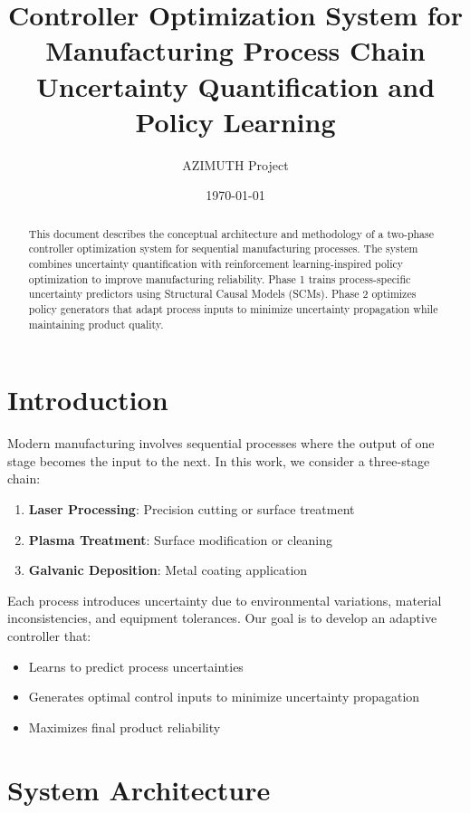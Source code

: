 \documentclass[11pt,a4paper]{article}
\title{\textbf{Controller Optimization System for Manufacturing Process Chain}\\
\large Uncertainty Quantification and Policy Learning}
\author{AZIMUTH Project}
\date{\today}
\begin{document}
\maketitle

\begin{abstract}
This document describes the conceptual architecture and methodology of a two-phase controller optimization system for sequential manufacturing processes. The system combines uncertainty quantification with reinforcement learning-inspired policy optimization to improve manufacturing reliability. Phase 1 trains process-specific uncertainty predictors using Structural Causal Models (SCMs). Phase 2 optimizes policy generators that adapt process inputs to minimize uncertainty propagation while maintaining product quality.
\end{abstract}

\section{Introduction}

Modern manufacturing involves sequential processes where the output of one stage becomes the input to the next. In this work, we consider a three-stage chain:

\begin{enumerate}
    \item \textbf{Laser Processing}: Precision cutting or surface treatment
    \item \textbf{Plasma Treatment}: Surface modification or cleaning
    \item \textbf{Galvanic Deposition}: Metal coating application
\end{enumerate}

Each process introduces uncertainty due to environmental variations, material inconsistencies, and equipment tolerances. Our goal is to develop an adaptive controller that:
\begin{itemize}
    \item Learns to predict process uncertainties
    \item Generates optimal control inputs to minimize uncertainty propagation
    \item Maximizes final product reliability
\end{itemize}

\section{System Architecture}
\end{document}
